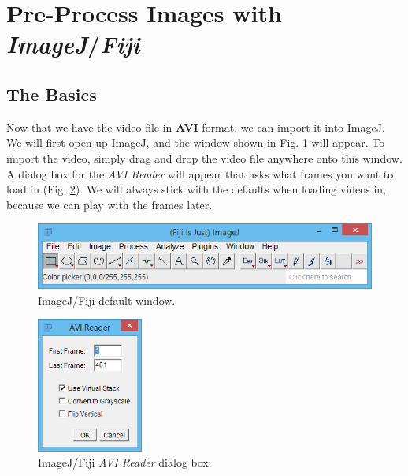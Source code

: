 \documentclass[letterpaper,12pt]{article}
\begin{document}
\section{Pre-Process Images with \textit{ImageJ}/\textit{Fiji}}
\label{sec:IMAGEJ_FIJI}

\subsection{The Basics}
\label{subsec:The_Basics}

Now that we have the video file in \textbf{AVI} format, we can import it into ImageJ.  We will first open up ImageJ, and the window shown in Fig. \ref{fig:ImageJ_Window} will appear.  To import the video, simply drag and drop the video file anywhere onto this window.  A dialog box for the \textcolor{myMagenta}{\textit{AVI Reader}} will appear that asks what frames you want to load in (Fig. \ref{fig:ImageJ_Load_Window}).  We will always stick with the defaults when loading videos in, because we can play with the frames later.

\begin{figure}[h]
    \centering
    \includegraphics[width=0.8\linewidth]{ImageJ_Window.PNG}
    \caption{ImageJ/Fiji default window.}
    \label{fig:ImageJ_Window}
\end{figure}

\begin{figure}[h]
    \centering
    \includegraphics[width=3.5cm]{ImageJ_Load_Window.PNG}
    \caption{ImageJ/Fiji \textit{AVI Reader} dialog box.}
    \label{fig:ImageJ_Load_Window}
\end{figure}
\end{document}
